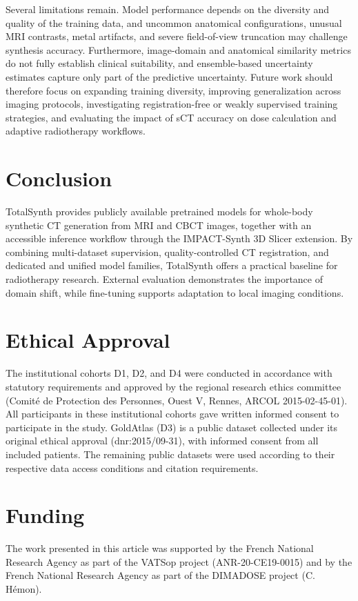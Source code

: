 \documentclass{article}
\begin{document}
Several limitations remain. Model performance depends on the diversity and quality of the training data, and uncommon anatomical configurations, unusual MRI contrasts, metal artifacts, and severe field-of-view truncation may challenge synthesis accuracy. Furthermore, image-domain and anatomical similarity metrics do not fully establish clinical suitability, and ensemble-based uncertainty estimates capture only part of the predictive uncertainty. Future work should therefore focus on expanding training diversity, improving generalization across imaging protocols, investigating registration-free or weakly supervised training strategies, and evaluating the impact of sCT accuracy on dose calculation and adaptive radiotherapy workflows.

\section{Conclusion}

TotalSynth provides publicly available pretrained models for whole-body synthetic CT generation from MRI and CBCT images, together with an accessible inference workflow through the IMPACT-Synth 3D Slicer extension. By combining multi-dataset supervision, quality-controlled CT registration, and dedicated and unified model families, TotalSynth offers a practical baseline for radiotherapy research. External evaluation demonstrates the importance of domain shift, while fine-tuning supports adaptation to local imaging conditions.


\section{Ethical Approval}
\label{sec:ethics}
The institutional cohorts D1, D2, and D4 were conducted in accordance with statutory requirements and approved by the regional research ethics committee (Comité de Protection des Personnes, Ouest V, Rennes, ARCOL 2015-02-45-01). All participants in these institutional cohorts gave written informed consent to participate in the study. GoldAtlas (D3) is a public dataset collected under its original ethical approval (dnr:2015/09-31), with informed consent from all included patients. The remaining public datasets were used according to their respective data access conditions and citation requirements.

\section{Funding}
\label{sec:acknowledgments}
The work presented in this article was supported by the French National Research Agency as part of the VATSop project (ANR-20-CE19-0015) and by the French National Research Agency as part of the DIMADOSE project (C. Hémon).
\end{document}
